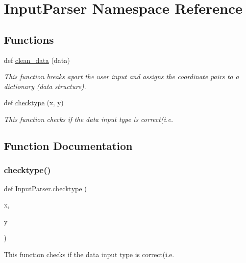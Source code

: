 \hypertarget{namespace_input_parser}{}\section{Input\+Parser Namespace Reference}
\label{namespace_input_parser}
\subsection*{Functions}
\begin{DoxyCompactItemize}
\item 
def \hyperlink{namespace_input_parser_a78eaa27b614b5d2df44f32bc64d545d3}{clean\+\_\+data} (data)
\begin{DoxyCompactList}\small\item\em This function breaks apart the user input and assigns the coordinate pairs to a dictionary (data structure). \end{DoxyCompactList}\item 
def \hyperlink{namespace_input_parser_a0252c2663de05263dfe64d97f6410cdf}{checktype} (x, y)
\begin{DoxyCompactList}\small\item\em This function checks if the data input type is correct(i.\+e. \end{DoxyCompactList}\end{DoxyCompactItemize}


\subsection{Function Documentation}
\hypertarget{namespace_input_parser_a0252c2663de05263dfe64d97f6410cdf}{}\label{namespace_input_parser_a0252c2663de05263dfe64d97f6410cdf} 
\subsubsection{\texorpdfstring{checktype()}{checktype()}}
{\footnotesize\ttfamily def Input\+Parser.\+checktype (\begin{DoxyParamCaption}\item[{}]{x,  }\item[{}]{y }\end{DoxyParamCaption})}



This function checks if the data input type is correct(i.\+e. 

